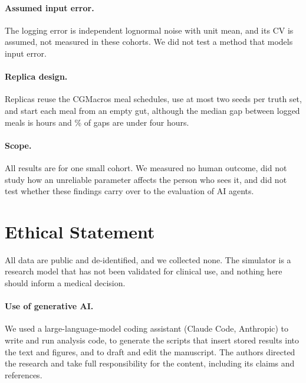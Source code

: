 \documentclass[letterpaper]{article} %
\begin{document}
\paragraph{Assumed input error.} The logging error is independent lognormal noise with unit mean, and its CV is assumed, not measured in these cohorts. We did not test a method that models input error.

\paragraph{Replica design.} Replicas reuse the \wsN{} CGMacros meal schedules, use at most two seeds per truth set, and start each meal from an empty gut, although the median gap between logged meals is \resOverlapMedianGap{} hours and \resOverlapWithinFour\% of gaps are under four hours.

\paragraph{Scope.} All results are for one small cohort. We measured no human outcome, did not study how an unreliable parameter affects the person who sees it, and did not test whether these findings carry over to the evaluation of AI agents.

\section*{Ethical Statement}

All data are public and de-identified, and we collected none. The simulator is a research model that has not been validated for clinical use, and nothing here should inform a medical decision.

\paragraph{Use of generative AI.} We used a large-language-model coding assistant (Claude Code, Anthropic) to write and run analysis code, to generate the scripts that insert stored results into the text and figures, and to draft and edit the manuscript. The authors directed the research and take full responsibility for the content, including its claims and references.


\end{document}
